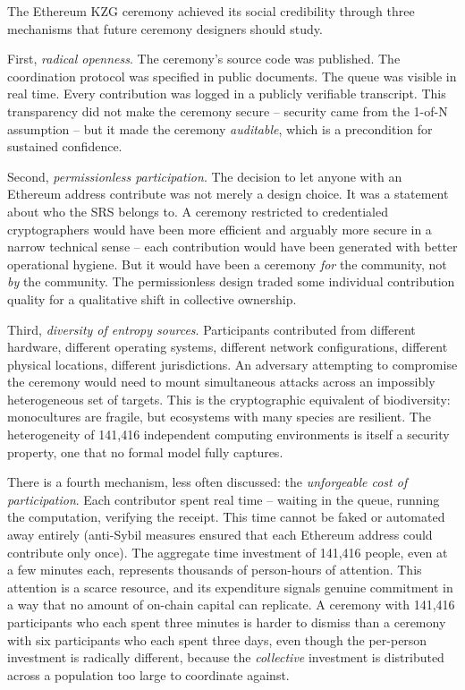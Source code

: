 \documentclass[
  11pt,
  openany]{report}
\begin{document}
The Ethereum KZG ceremony achieved its social credibility through three
mechanisms that future ceremony designers should study.

First, \emph{radical openness}. The ceremony's source code was published. The
coordination protocol was specified in public documents. The queue was visible
in real time. Every contribution was logged in a publicly verifiable transcript.
This transparency did not make the ceremony secure -- security came from the
1-of-N assumption -- but it made the ceremony \emph{auditable}, which is a
precondition for sustained confidence.

Second, \emph{permissionless participation}. The decision to let anyone with an
Ethereum address contribute was not merely a design choice. It was a statement
about who the SRS belongs to. A ceremony restricted to credentialed
cryptographers would have been more efficient and arguably more secure in a
narrow technical sense -- each contribution would have been generated with
better operational hygiene. But it would have been a ceremony \emph{for} the
community, not \emph{by} the community. The permissionless design traded some
individual contribution quality for a qualitative shift in collective ownership.

Third, \emph{diversity of entropy sources}. Participants contributed from
different hardware, different operating systems, different network
configurations, different physical locations, different jurisdictions. An
adversary attempting to compromise the ceremony would need to mount simultaneous
attacks across an impossibly heterogeneous set of targets. This is the
cryptographic equivalent of biodiversity: monocultures are fragile, but
ecosystems with many species are resilient. The heterogeneity of 141,416
independent computing environments is itself a security property, one that no
formal model fully captures.

There is a fourth mechanism, less often discussed: the \emph{unforgeable cost of
participation}. Each contributor spent real time -- waiting in the queue,
running the computation, verifying the receipt. This time cannot be faked or
automated away entirely (anti-Sybil measures ensured that each Ethereum address
could contribute only once). The aggregate time investment of 141,416 people,
even at a few minutes each, represents thousands of person-hours of attention.
This attention is a scarce resource, and its expenditure signals genuine
commitment in a way that no amount of on-chain capital can replicate. A ceremony
with 141,416 participants who each spent three minutes is harder to dismiss than
a ceremony with six participants who each spent three days, even though the
per-person investment is radically different, because the \emph{collective}
investment is distributed across a population too large to coordinate against.
\end{document}
